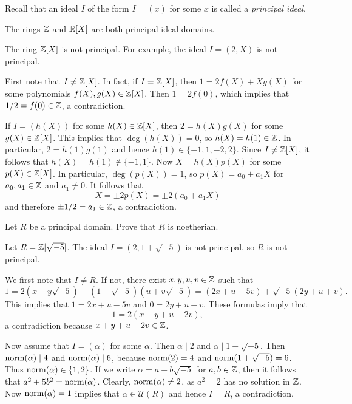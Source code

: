 Recall that an ideal $I$ of the form $I=(x)$ for some $x$ is called a \emph{principal ideal}. 

The rings $\mathbb{Z}$ and $\mathbb{R}[X]$ are both principal ideal domains. 

\begin{example}
	The ring $\mathbb{Z}[X]$ is not principal. For example, the ideal
	$I=(2,X)$ is not principal. 
	
  First note that $I\ne\mathbb{Z}[X]$. In fact, if $I=\mathbb{Z}[X]$, then $1=2f(X)+Xg(X)$ for
  some polynomials $f(X),g(X)\in\mathbb{Z}[X]$. Then $1=2f(0)$, which implies that
  $1/2=f(0)\in\mathbb{Z}$, a contradiction. 
	
  If $I=(h(X))$ for some $h(X)\in\mathbb{Z}[X]$, then $2=h(X)g(X)$ for some
  $g(X)\in\mathbb{Z}[X]$. This implies that $\deg(h(X))=0$, so $h(X)=h(1)\in\mathbb{Z}$. In
  particular, $2=h(1)g(1)$ and hence $h(1)\in\{-1,1,-2,2\}$. Since $I\ne\mathbb{Z}[X]$,
  it follows that $h(X)=h(1)\not\in\{-1,1\}$. Now      $X=h(X)p(X)$ for some
  $p(X)\in\mathbb{Z}[X]$. In particular, $\deg(p(X))=1$, so $p(X)=a_0+a_1X$ for
  $a_0,a_1\in\mathbb{Z}$ and $a_1\ne 0$. 	It follows that 
	\[
	X=\pm 2p(X)=\pm2(a_0+a_1X)
	\]
	and therefore $\pm1/2=a_1\in\mathbb{Z}$, a contradiction.
\end{example}

\begin{exercise}
\label{xca:principal=>noetherian}
    Let $R$ be a principal domain. Prove that $R$ is noetherian.
\end{exercise}

\begin{example}
	Let $R=\mathbb{Z}[\sqrt{-5}]$.  
	The ideal $I=(2,1+\sqrt{-5})$ is not principal, so $R$ is not principal. 
	
	We first note that $I\ne R$. If not, there exist $x,y,u,v\in\mathbb{Z}$ such that 
	\[
	1=2(x+y\sqrt{-5})+(1+\sqrt{-5})(u+v\sqrt{-5})=(2x+u-5v)+\sqrt{-5}(2y+u+v).
	\]
	This implies that $1=2x+u-5v$ and $0=2y+u+v$. These formulas imply that
	\[
    1=2(x+y+u-2v),
    \]
    a contradiction because $x+y+u-2v\in\mathbb{Z}$. 
	
  Now assume that $I=(\alpha)$ for some $\alpha$. Then $\alpha\mid 2$ and
  $\alpha\mid 1+\sqrt{-5}$. Then $\operatorname{norm}(\alpha)\mid 4$ and $\operatorname{norm}(\alpha)\mid
  6$, because $\operatorname{norm}(2)=4$ and $\operatorname{norm}(1+\sqrt{-5})=6$.  Thus
  $\operatorname{norm}(\alpha)\in\{1,2\}$. If we write $\alpha=a+b\sqrt{-5}$ for $a,b\in\mathbb{Z}$,
  then it follows that $a^2+5b^2=\operatorname{norm}(\alpha)$. Clearly, $\operatorname{norm}(\alpha)\ne 2$,
  as $a^2=2$ has no solution in $\mathbb{Z}$.  Now $\operatorname{norm}(\alpha)= 1$ implies that
  $\alpha\in\mathcal{U}(R)$ and hence $I=R$, a contradiction.   
\end{example}

